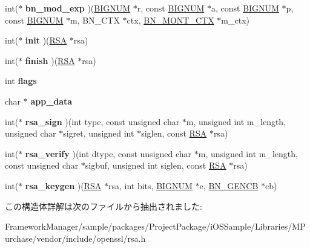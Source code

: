 \begin{DoxyCompactItemize}
\item 
\hypertarget{structrsa__meth__st_a1dc3f40f6072ffed989d7dfedc66cda1}{}int($\ast$ {\bfseries bn\+\_\+mod\+\_\+exp} )(\hyperlink{structbignum__st}{B\+I\+G\+N\+U\+M} $\ast$r, const \hyperlink{structbignum__st}{B\+I\+G\+N\+U\+M} $\ast$a, const \hyperlink{structbignum__st}{B\+I\+G\+N\+U\+M} $\ast$p, const \hyperlink{structbignum__st}{B\+I\+G\+N\+U\+M} $\ast$m, B\+N\+\_\+\+C\+T\+X $\ast$ctx, \hyperlink{structbn__mont__ctx__st}{B\+N\+\_\+\+M\+O\+N\+T\+\_\+\+C\+T\+X} $\ast$m\+\_\+ctx)\label{structrsa__meth__st_a1dc3f40f6072ffed989d7dfedc66cda1}

\item 
\hypertarget{structrsa__meth__st_ac8c394e65dbeda15573657fb550c5fe7}{}int($\ast$ {\bfseries init} )(\hyperlink{structrsa__st}{R\+S\+A} $\ast$rsa)\label{structrsa__meth__st_ac8c394e65dbeda15573657fb550c5fe7}

\item 
\hypertarget{structrsa__meth__st_a12aded957112894c6fd832168a380fbc}{}int($\ast$ {\bfseries finish} )(\hyperlink{structrsa__st}{R\+S\+A} $\ast$rsa)\label{structrsa__meth__st_a12aded957112894c6fd832168a380fbc}

\item 
\hypertarget{structrsa__meth__st_ab01ea2742087308a50209ccff23832c7}{}int {\bfseries flags}\label{structrsa__meth__st_ab01ea2742087308a50209ccff23832c7}

\item 
\hypertarget{structrsa__meth__st_a3d4a936065797413aad5dc1c7a132f00}{}char $\ast$ {\bfseries app\+\_\+data}\label{structrsa__meth__st_a3d4a936065797413aad5dc1c7a132f00}

\item 
\hypertarget{structrsa__meth__st_a9417375cd40a1ebef8631897593212e5}{}int($\ast$ {\bfseries rsa\+\_\+sign} )(int type, const unsigned char $\ast$m, unsigned int m\+\_\+length, unsigned char $\ast$sigret, unsigned int $\ast$siglen, const \hyperlink{structrsa__st}{R\+S\+A} $\ast$rsa)\label{structrsa__meth__st_a9417375cd40a1ebef8631897593212e5}

\item 
\hypertarget{structrsa__meth__st_a9a5b98e6b902fd0a31b0663b91460627}{}int($\ast$ {\bfseries rsa\+\_\+verify} )(int dtype, const unsigned char $\ast$m, unsigned int m\+\_\+length, const unsigned char $\ast$sigbuf, unsigned int siglen, const \hyperlink{structrsa__st}{R\+S\+A} $\ast$rsa)\label{structrsa__meth__st_a9a5b98e6b902fd0a31b0663b91460627}

\item 
\hypertarget{structrsa__meth__st_a08d964380b9ca4fd0d7664fe0d14dfd0}{}int($\ast$ {\bfseries rsa\+\_\+keygen} )(\hyperlink{structrsa__st}{R\+S\+A} $\ast$rsa, int bits, \hyperlink{structbignum__st}{B\+I\+G\+N\+U\+M} $\ast$e, \hyperlink{structbn__gencb__st}{B\+N\+\_\+\+G\+E\+N\+C\+B} $\ast$cb)\label{structrsa__meth__st_a08d964380b9ca4fd0d7664fe0d14dfd0}

\end{DoxyCompactItemize}


この構造体詳解は次のファイルから抽出されました\+:\begin{DoxyCompactItemize}
\item 
Framework\+Manager/sample/packages/\+Project\+Package/i\+O\+S\+Sample/\+Libraries/\+M\+Purchase/vendor/include/openssl/rsa.\+h\end{DoxyCompactItemize}
